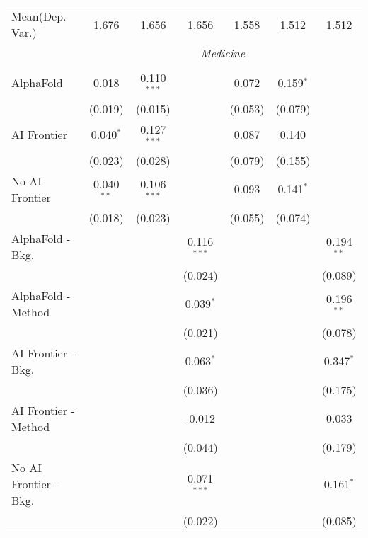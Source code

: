 \begin{tabular}{lcccccc}
Mean(Dep. Var.) & 1.676 & 1.656 & 1.656 & 1.558 & 1.512 & 1.512 \\
 & \multicolumn{6}{c}{\textit{Medicine}} \\ \\
   AlphaFold               & 0.018        & 0.110$^{***}$ &               & 0.072   & 0.159$^{*}$ &   \\   
                           & (0.019)      & (0.015)       &               & (0.053) & (0.079)     &   \\   
   AI Frontier             & 0.040$^{*}$  & 0.127$^{***}$ &               & 0.087   & 0.140       &   \\   
                           & (0.023)      & (0.028)       &               & (0.079) & (0.155)     &   \\   
   No AI Frontier          & 0.040$^{**}$ & 0.106$^{***}$ &               & 0.093   & 0.141$^{*}$ &   \\   
                           & (0.018)      & (0.023)       &               & (0.055) & (0.074)     &   \\   
   AlphaFold - Bkg.        &              &               & 0.116$^{***}$ &         &             & 0.194$^{**}$\\   
                           &              &               & (0.024)       &         &             & (0.089)\\   
   AlphaFold - Method      &              &               & 0.039$^{*}$   &         &             & 0.196$^{**}$\\   
                           &              &               & (0.021)       &         &             & (0.078)\\   
   AI Frontier - Bkg.      &              &               & 0.063$^{*}$   &         &             & 0.347$^{*}$\\   
                           &              &               & (0.036)       &         &             & (0.175)\\   
   AI Frontier - Method    &              &               & -0.012        &         &             & 0.033\\   
                           &              &               & (0.044)       &         &             & (0.179)\\   
   No AI Frontier - Bkg.   &              &               & 0.071$^{***}$ &         &             & 0.161$^{*}$\\   
                           &              &               & (0.022)       &         &             & (0.085)\\   

\end{tabular}
